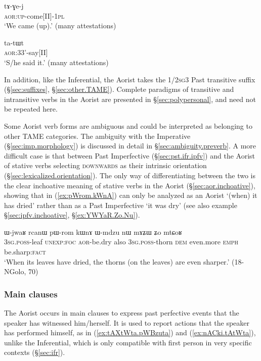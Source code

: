 \begin{exe}
\ex \label{ex:tAGej}
 \gll tɤ-ɣe-j \\
\textsc{aor}:\textsc{up}-come[II]-\textsc{1pl} \\
\glt `We came (up).' (many attestations)
\end{exe}

\begin{exe}
\ex \label{ex:tatWt}
 \gll ta-tɯt \\
\textsc{aor}:3\fl{}3'-say[II]  \\
\glt `S/he said it.' (many attestations)
\end{exe}

In addition, like the Inferential, the Aorist takes the 1/2\textsc{sg}\fl{}3 Past transitive suffix  (§\ref{sec:suffixes}, §\ref{sec:other.TAME}). Complete paradigms of transitive and intransitive verbs in the Aorist are presented in §\ref{sec:polypersonal}, and need not be repeated here.

Some Aorist verb forms are ambiguous and could be interpreted as belonging to other TAME categories. The ambiguity with the Imperative (§\ref{sec:imp.morphology}) is discussed in detail in §\ref{sec:ambiguity.preverb}. A more difficult case is that between Past Imperfective  (§\ref{sec:pst.ifr.ipfv}) and the Aorist of stative verbs selecting \textsc{downwards} as their intrinsic orientation (§\ref{sec:lexicalized.orientation}). The only way of differentiating between the two is the clear inchoative meaning of stative verbs in the Aorist (§\ref{sec:aor.inchoative}), showing that  in (\ref{ex:pWrom.kWnA}) can only be analyzed as an Aorist `(when) it has dried' rather than as a Past Imperfective `it was dry' (see also example §\ref{sec:ipfv.inchoative},  §\ref{ex:YWYaR.Zo.Nu}).

\begin{exe}
\ex \label{ex:pWrom.kWnA}
 \gll  ɯ-jwaʁ rcanɯ pɯ-rom kɯnɤ ɯ-mdzu nɯ mɤʑɯ ʑo mtɕoʁ \\
\textsc{3sg}.\textsc{poss}-leaf \textsc{unexp}:\textsc{foc} \textsc{aor}-be.dry also \textsc{3sg}.\textsc{poss}-thorn \textsc{dem} even.more \textsc{emph} be.sharp:\textsc{fact} \\
\glt `When its leaves have dried, the thorns (on the leaves) are even sharper.' (18-NGolo, 70)
\end{exe}

\subsubsection{Main clauses}   \label{sec:aor.main}
The Aorist occurs in main clauses to express past perfective events that the speaker has witnessed him/herself. It is used to report actions that the speaker has performed himself, as in (\ref{ex:tAXtWta.pWBzuta}) and (\ref{ex:nACki.tAtWta}), unlike the Inferential, which is only compatible with first person in very specific contexts (§\ref{sec:ifr}).

